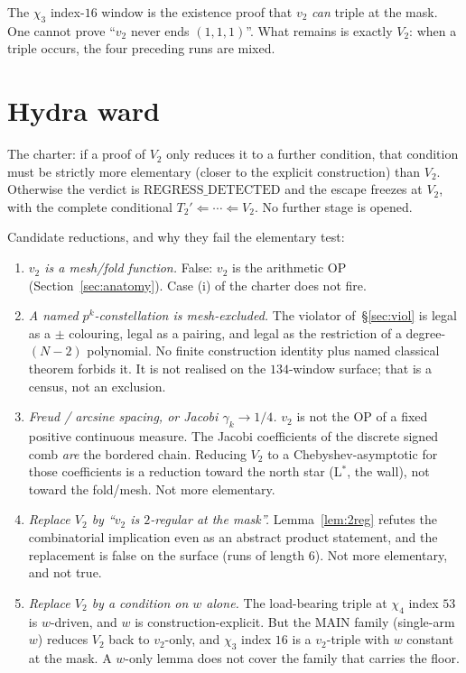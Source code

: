 \documentclass[11pt]{article}
\theoremstyle{remark}
\begin{document}
The $\chi_3$ index-$16$ window is the existence proof that $v_2$
\emph{can} triple at the mask.  One cannot prove ``$v_2$ never
ends $(1,1,1)$''.  What remains is exactly $V_2$: when a triple
occurs, the four preceding runs are mixed.

\section{Hydra ward}\label{sec:hydra}

The charter: if a proof of $V_2$ only reduces it to a further
condition, that condition must be strictly more elementary
(closer to the explicit construction) than $V_2$.  Otherwise the
verdict is $\mathrm{REGRESS\_DETECTED}$ and the escape freezes at
$V_2$, with the complete conditional
$T_2'\Leftarrow\cdots\Leftarrow V_2$.  No further stage is opened.

Candidate reductions, and why they fail the elementary test:

\begin{enumerate}
\item \emph{$v_2$ is a mesh/fold function.}  False: $v_2$ is the
  arithmetic OP (Section~\ref{sec:anatomy}).  Case (i) of the
  charter does not fire.
\item \emph{A named $p^k$-constellation is mesh-excluded.}  The
  violator of~\S\ref{sec:viol} is legal as a $\pm$ colouring, legal
  as a pairing, and legal as the restriction of a degree-$(N-2)$
  polynomial.  No finite construction identity plus named
  classical theorem forbids it.  It is not realised on the
  $134$-window surface; that is a census, not an exclusion.
\item \emph{Freud / arcsine spacing, or Jacobi $\gamma_k\to 1/4$.}
  $v_2$ is not the OP of a fixed positive continuous measure.
  The Jacobi coefficients of the discrete signed comb \emph{are}
  the bordered chain.  Reducing $V_2$ to a Chebyshev-asymptotic
  for those coefficients is a reduction toward the north star
  (L$^*$, the wall), not toward the fold/mesh.  Not more
  elementary.
\item \emph{Replace $V_2$ by ``$v_2$ is $2$-regular at the mask''.}
  Lemma~\ref{lem:2reg} refutes the combinatorial implication even
  as an abstract product statement, and the replacement is false
  on the surface (runs of length $6$).  Not more elementary, and
  not true.
\item \emph{Replace $V_2$ by a condition on $w$ alone.}  The
  load-bearing triple at $\chi_4$ index $53$ is $w$-driven, and
  $w$ is construction-explicit.  But the MAIN family (single-arm
  $w$) reduces $V_2$ back to $v_2$-only, and $\chi_3$ index $16$
  is a $v_2$-triple with $w$ constant at the mask.  A $w$-only
  lemma does not cover the family that carries the floor.
\end{enumerate}
\end{document}
